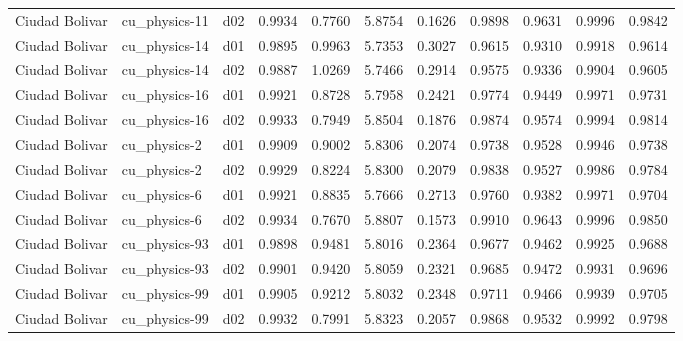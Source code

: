 \begin{longtable}{lllrrrrrrrr}
       Ciudad Bolivar  &         cu\_physics-11 &     d02 &   0.9934 &   0.7760 &   5.8754 &       0.1626 &        0.9898 &       0.9631 &           0.9996 &  0.9842 \\
       Ciudad Bolivar  &         cu\_physics-14 &     d01 &   0.9895 &   0.9963 &   5.7353 &       0.3027 &        0.9615 &       0.9310 &           0.9918 &  0.9614 \\
       Ciudad Bolivar  &         cu\_physics-14 &     d02 &   0.9887 &   1.0269 &   5.7466 &       0.2914 &        0.9575 &       0.9336 &           0.9904 &  0.9605 \\
       Ciudad Bolivar  &         cu\_physics-16 &     d01 &   0.9921 &   0.8728 &   5.7958 &       0.2421 &        0.9774 &       0.9449 &           0.9971 &  0.9731 \\
       Ciudad Bolivar  &         cu\_physics-16 &     d02 &   0.9933 &   0.7949 &   5.8504 &       0.1876 &        0.9874 &       0.9574 &           0.9994 &  0.9814 \\
       Ciudad Bolivar  &          cu\_physics-2 &     d01 &   0.9909 &   0.9002 &   5.8306 &       0.2074 &        0.9738 &       0.9528 &           0.9946 &  0.9738 \\
       Ciudad Bolivar  &          cu\_physics-2 &     d02 &   0.9929 &   0.8224 &   5.8300 &       0.2079 &        0.9838 &       0.9527 &           0.9986 &  0.9784 \\
       Ciudad Bolivar  &          cu\_physics-6 &     d01 &   0.9921 &   0.8835 &   5.7666 &       0.2713 &        0.9760 &       0.9382 &           0.9971 &  0.9704 \\
       Ciudad Bolivar  &          cu\_physics-6 &     d02 &   0.9934 &   0.7670 &   5.8807 &       0.1573 &        0.9910 &       0.9643 &           0.9996 &  0.9850 \\
       Ciudad Bolivar  &         cu\_physics-93 &     d01 &   0.9898 &   0.9481 &   5.8016 &       0.2364 &        0.9677 &       0.9462 &           0.9925 &  0.9688 \\
       Ciudad Bolivar  &         cu\_physics-93 &     d02 &   0.9901 &   0.9420 &   5.8059 &       0.2321 &        0.9685 &       0.9472 &           0.9931 &  0.9696 \\
       Ciudad Bolivar  &         cu\_physics-99 &     d01 &   0.9905 &   0.9212 &   5.8032 &       0.2348 &        0.9711 &       0.9466 &           0.9939 &  0.9705 \\
       Ciudad Bolivar  &         cu\_physics-99 &     d02 &   0.9932 &   0.7991 &   5.8323 &       0.2057 &        0.9868 &       0.9532 &           0.9992 &  0.9798 \\

\end{longtable}
